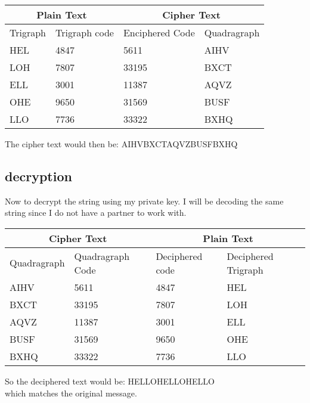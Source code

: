 \documentclass[14pt]{article}
\begin{document}
\begin{center}
    \begin{tabular}{| l | l | l | l |}
      \hline
      \multicolumn{2}{|c|}{Plain Text} &
      \multicolumn{2}{|c|}{Cipher Text} \\
      \hline
      Trigraph &
      Trigraph code &
      Enciphered Code &
      Quadragraph \\
      \hline
      HEL & 4847 & 5611 & AIHV\\
      LOH & 7807 & 33195 & BXCT\\
      ELL & 3001 & 11387 & AQVZ\\
      OHE & 9650 & 31569 & BUSF\\
      LLO & 7736 & 33322 & BXHQ\\
      \hline
    \end{tabular}
\end{center}
The cipher text would then be:
AIHVBXCTAQVZBUSFBXHQ
\subsection{decryption}
Now to decrypt the string using my private key.
I will be decoding the same string since I do not have a partner to work with.
\begin{center}
    \begin{tabular}{| l | l | l | l |}
      \hline
      \multicolumn{2}{|c|}{Cipher Text} &
      \multicolumn{2}{|c|}{Plain Text} \\
      \hline
      Quadragraph &
      Quadragraph Code &
      Deciphered code &
      Deciphered Trigraph \\
      \hline
      AIHV & 5611  & 4847 & HEL\\
      BXCT & 33195 & 7807 & LOH\\
      AQVZ & 11387 & 3001 & ELL\\
      BUSF & 31569 & 9650 & OHE\\
      BXHQ & 33322 & 7736 & LLO\\
      \hline
    \end{tabular}
\end{center}
So the deciphered text would be:
HELLOHELLOHELLO\\
which matches the original message.
\end{document}
